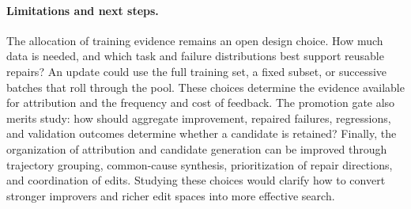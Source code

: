 \documentclass[letterpaper]{article}
\begin{document}
\paragraph{Limitations and next steps.}
The allocation of training evidence remains an open design choice. How much data is needed, and which task and failure distributions best support reusable repairs? An update could use the full training set, a fixed subset, or successive batches that roll through the pool. These choices determine the evidence available for attribution and the frequency and cost of feedback. The promotion gate also merits study: how should aggregate improvement, repaired failures, regressions, and validation outcomes determine whether a candidate is retained? Finally, the organization of attribution and candidate generation can be improved through trajectory grouping, common-cause synthesis, prioritization of repair directions, and coordination of edits. Studying these choices would clarify how to convert stronger improvers and richer edit spaces into more effective search.

\clearpage

\clearpage

\end{document}
